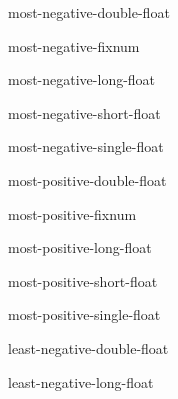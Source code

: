 \documentclass[10pt,english]{book}
\begin{document}
\begin{constant}{most-negative-double-float}{}
  
\end{constant}

\begin{constant}{most-negative-fixnum}{}
  
\end{constant}

\begin{constant}{most-negative-long-float}{}
  
\end{constant}

\begin{constant}{most-negative-short-float}{}
  
\end{constant}

\begin{constant}{most-negative-single-float}{}
  
\end{constant}

\begin{constant}{most-positive-double-float}{}
  
\end{constant}

\begin{constant}{most-positive-fixnum}{}
  
\end{constant}

\begin{constant}{most-positive-long-float}{}
  
\end{constant}

\begin{constant}{most-positive-short-float}{}
  
\end{constant}

\begin{constant}{most-positive-single-float}{}
  
\end{constant}

\begin{constant}{least-negative-double-float}{}
  
\end{constant}

\begin{constant}{least-negative-long-float}{}
  
\end{constant}
\end{document}
